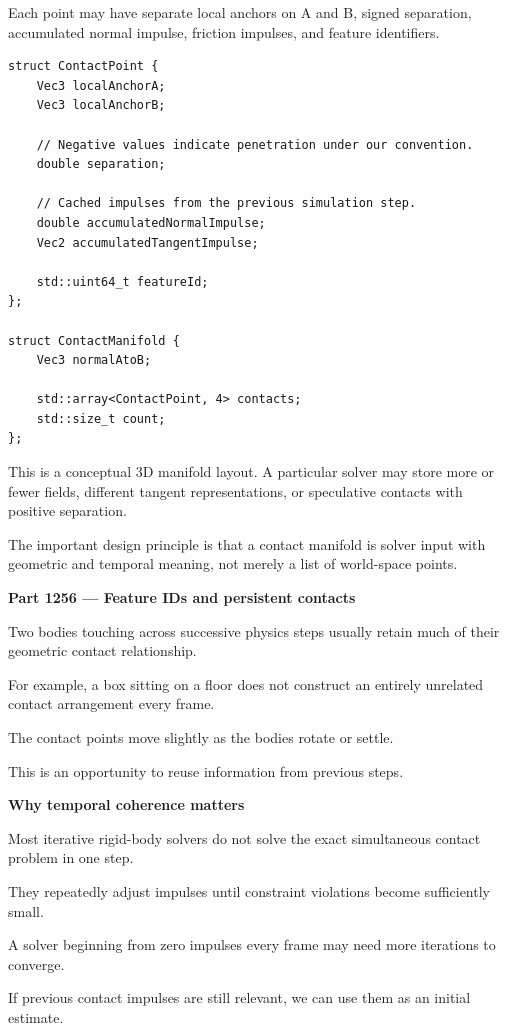 Each point may have separate local anchors on A and B, signed separation, accumulated normal impulse, friction impulses, and feature identifiers.

\begin{verbatim}
struct ContactPoint {
    Vec3 localAnchorA;
    Vec3 localAnchorB;

    // Negative values indicate penetration under our convention.
    double separation;

    // Cached impulses from the previous simulation step.
    double accumulatedNormalImpulse;
    Vec2 accumulatedTangentImpulse;

    std::uint64_t featureId;
};

struct ContactManifold {
    Vec3 normalAtoB;

    std::array<ContactPoint, 4> contacts;
    std::size_t count;
};
\end{verbatim}

This is a conceptual 3D manifold layout. A particular solver may store more or fewer fields, different tangent representations, or speculative contacts with positive separation.

The important design principle is that a contact manifold is solver input with geometric and temporal meaning, not merely a list of world-space points.

\textbf{Part 1256 --- Feature IDs and persistent contacts}

Two bodies touching across successive physics steps usually retain much of their geometric contact relationship.

For example, a box sitting on a floor does not construct an entirely unrelated contact arrangement every frame.

The contact points move slightly as the bodies rotate or settle.

This is an opportunity to reuse information from previous steps.

\textbf{Why temporal coherence matters}

Most iterative rigid-body solvers do not solve the exact simultaneous contact problem in one step.

They repeatedly adjust impulses until constraint violations become sufficiently small.

A solver beginning from zero impulses every frame may need more iterations to converge.

If previous contact impulses are still relevant, we can use them as an initial estimate.

